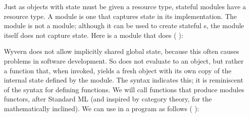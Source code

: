 \documentclass{article}
\begin{document}
\begin{mdP}[data-line={335}]%
{}Just as objects with state must be given a resource type, stateful
modules have a resource type.  A %
{}%
{} module is one that captures
state in its implementation.  The %
{}%
{} module is not a %
{}%
{}
module; although it can be used to create stateful %
{}%
{}s, the module
itself does not capture state.  Here is a module that does (%
{}%
{}):%
\end{mdP}%
\begin{mdPre}[class={para-block,pre-indented},data-line={341}]%
%
\end{mdPre}%
\begin{mdP}[data-line={348}]%
{}Wyvern does not allow implicitly shared global state, because this
often causes problems in software development.  So %
{}%
{} does
not evaluate to an object, but rather a function that, when invoked,
yields a fresh object with its own copy of the internal state defined
by the module.  The %
{}%
{} syntax indicates this; it is reminiscent
of the %
{}%
{} syntax for defining functions.  We will call functions that
produce modules functors, after Standard ML (and inspired by category
theory, for the mathematically inclined).  We can use %
{}%
{} in
a program as follows (%
{}%
{}):%
\end{mdP}%
\end{document}
